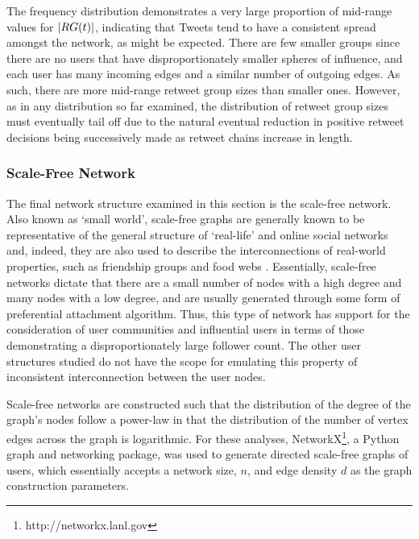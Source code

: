The frequency distribution demonstrates a very large proportion of mid-range values for $|RG(t)|$, indicating that Tweets tend to have a consistent spread amongst the network, as might be expected. There are few smaller groups since there are no users that have disproportionately smaller spheres of influence, and each user has many incoming edges and a similar number of outgoing edges. As such, there are more mid-range retweet group sizes than smaller ones. However, as in any distribution so far examined, the distribution of retweet group sizes must eventually tail off due to the natural eventual reduction in positive retweet decisions being successively made as retweet chains increase in length.


\subsubsection{Scale-Free Network}
The final network structure examined in this section is the scale-free network. Also known as `small world', scale-free graphs are generally known to be representative of the general structure of `real-life' and online social networks \cite{mislove07} and, indeed, they are also used to describe the interconnections of real-world properties, such as friendship groups and food webs \cite{guido07} \cite{hein06}. Essentially, scale-free networks dictate that there are a small number of nodes with a high degree and many nodes with a low degree, and are usually generated through some form of preferential attachment algorithm. Thus, this type of network has support for the consideration of user communities and influential users in terms of those demonstrating a disproportionately large follower count. The other user structures studied do not have the scope for emulating this property of inconsistent interconnection between the user nodes.

Scale-free networks are constructed such that the distribution of the degree of the graph's nodes follow a power-law in that the distribution of the number of vertex edges across the graph is logarithmic. For these analyses, NetworkX\footnote{http://networkx.lanl.gov}, a Python graph and networking package, was used to generate directed scale-free graphs of users, which essentially accepts a network size, $n$, and edge density $d$ as the graph construction parameters. 

